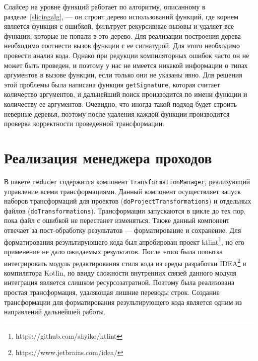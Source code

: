 Слайсер на уровне функций работает по алгоритму, описанному в разделе~\ref{slicingalg}, --- он строит дерево использований функций, где корнем является функция с ошибкой, фильтрует рекурсивные вызовы и удаляет все функции, которые не попали в это дерево. Для реализации построения дерева необходимо соотнести вызов функции с ее сигнатурой. Для этого необходимо провести анализ кода. Однако при редукции компиляторных ошибок часто он не может быть проведен, и поэтому у нас не имеется никакой информации о типах аргументов в вызове функции, если только они не указаны явно. Для решения этой проблемы была написана функция \texttt{getSignature}, которая считает количество аргументов, и дальнейший поиск производится по имени функции и количеству ее аргументов. Очевидно, что иногда такой подход будет строить неверные деревья, поэтому после удаления каждой функции производится проверка корректности проведенной трансформации.

\section{Реализация менеджера проходов}
В пакете \texttt{reducer} содержится компонент \texttt{TransformationManager}, реализующий управление всеми трансформациями. Данный компонент осуществляет запуск наборов трансформаций для проектов (\texttt{doProjectTransformations}) и отдельных файлов (\texttt{doTransformations}). Трансформации запускаются в цикле до тех пор, пока файл с ошибкой не перестанет изменяться. Также данный компонент отвечает за пост-обработку результатов --- форматирование и сохранение. Для форматирования результирующего кода был апробирован проект ktlint\footnote{https://github.com/shyiko/ktlint}, но его применение не дало ожидаемых результатов. После этого была попытка интегрировать модуль редактирования стиля кода из среды разработки IDEA\footnote{https://www.jetbrains.com/idea/} и компилятора Kotlin, но ввиду сложности внутренних связей данного модуля интеграция является слишком ресурсозатратной. Поэтому была реализована простая трансформация, удаляющая лишние переводы строк. Создание трансформации для форматирования результирующего кода является одним из направлений дальнейшей работы.

